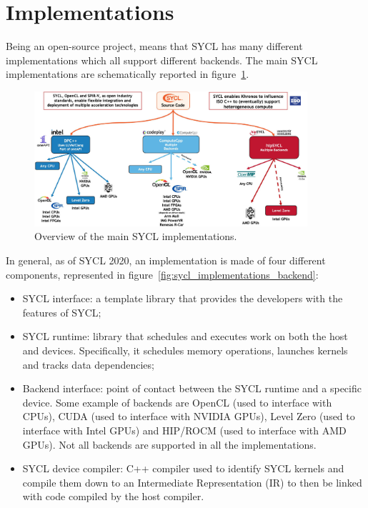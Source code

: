 \section{Implementations}
\label{ch:sycl_implementations}
Being an open-source project, means that SYCL has many different implementations which all support different backends. The main SYCL implementations are schematically reported in figure~\ref{fig:sycl_implementations}.

\begin{figure}[H]
    \centering
    \includegraphics[width=0.9\textwidth]{media/sycl_implementations.jpg}
    \caption{Overview of the main SYCL implementations.}
    \label{fig:sycl_implementations}
\end{figure}

In general, as of SYCL 2020, an implementation is made of four different components, represented in figure~\ref{fig:sycl_implementations_backend}: 
\begin{itemize}
    \item SYCL interface: a template library that provides the developers with the features of SYCL; 
    \item SYCL runtime: library that schedules and executes work on both the host and devices. Specifically, it schedules memory operations, launches kernels and tracks data dependencies;
    \item Backend interface: point of contact between the SYCL runtime and a specific device. Some example of backends are OpenCL (used to interface with CPUs), CUDA (used to interface with NVIDIA GPUs), Level Zero (used to interface with Intel GPUs) and HIP/ROCM (used to interface with AMD GPUs). Not all backends are supported in all the implementations. 
    \item SYCL device compiler: C++ compiler used to identify SYCL kernels and compile them down to an Intermediate Representation (IR) to then be linked with code compiled by the host compiler.
\end{itemize}

